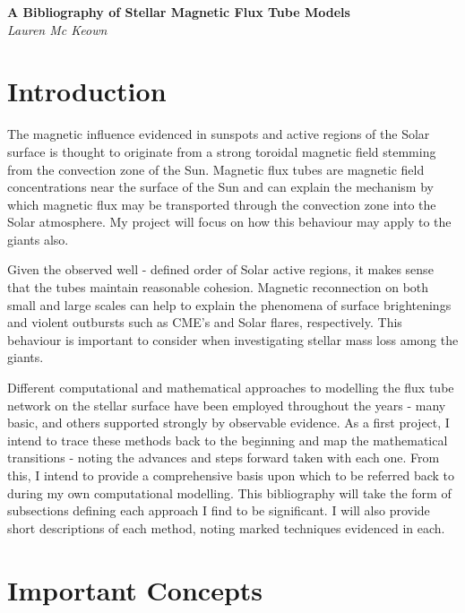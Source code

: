\documentclass[a4paper,12pt]{article}
\begin{document}
\begin{titlepage}
   \begin{center}
      \Large\textbf{A Bibliography of Stellar Magnetic Flux Tube Models}\\
      \large\textit{Lauren Mc Keown}
   \end{center}
\end{titlepage}


\section{Introduction}

The magnetic influence evidenced in sunspots and active regions of the Solar surface is thought to originate from a strong toroidal magnetic field stemming from the convection zone of the Sun. Magnetic flux tubes are magnetic field concentrations near the surface of the Sun and can explain the mechanism by which magnetic flux may be transported through the convection zone into the Solar atmosphere.\citep{people.hao} My project will focus on how this behaviour may apply to the giants also. 

Given the observed well - defined order of Solar active regions, it makes sense that the tubes maintain reasonable cohesion. Magnetic reconnection on both small and large scales can help to explain the phenomena of surface brightenings and violent outbursts such as CME's and Solar flares, respectively. \citep{Priest2000} This behaviour is important to consider when investigating stellar mass loss among the giants. 

Different computational and mathematical approaches to modelling the flux tube network on the stellar surface have been employed throughout the years - many basic, and others supported strongly by observable evidence. As a first project, I intend to trace these methods back to the beginning and map the mathematical transitions - noting the advances and steps forward taken with each one. From this, I intend to provide a comprehensive basis upon which to be referred back to during my own computational modelling. This bibliography will take the form of subsections defining each approach I find to be significant. I will also provide short descriptions of each method, noting marked techniques evidenced in each.

\section{Important Concepts}
\end{document}
